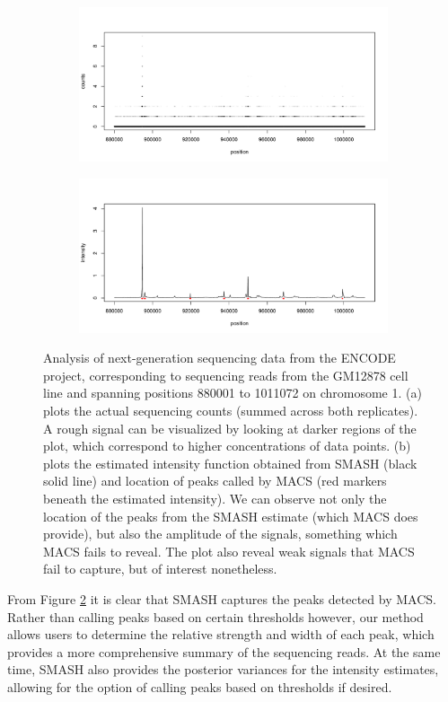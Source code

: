\documentclass[12pt]{article}
\begin{document}
\newpage
\begin{figure}
\centering
    \begin{subfigure}[b]{0.85\textwidth}
        \centering
        \includegraphics[width=\textwidth]{peaks_comp_a.png}
        \caption{}
        \label{fig:seq_peak_data}
    \end{subfigure}
    \begin{subfigure}[b]{0.85\textwidth}
        \centering
        \includegraphics[width=\textwidth]{peaks_comp_b.pdf}
        \caption{}
        \label{fig:seq_peak_est}
    \end{subfigure}
    \caption{Analysis of next-generation sequencing data from the ENCODE project, corresponding to sequencing reads from the GM12878 cell line and spanning positions 880001 to 1011072 on chromosome 1. (a) plots the actual sequencing counts (summed across both replicates). A rough signal can be visualized by looking at darker regions of the plot, which correspond to higher concentrations of data points. (b) plots the estimated intensity function obtained from SMASH (black solid line) and location of peaks called by MACS (red markers beneath the estimated intensity). We can observe not only the location of the peaks from the SMASH estimate (which MACS does provide), but also the amplitude of the signals, something which MACS fails to reveal. The plot also reveal weak signals that MACS fail to capture, but of interest nonetheless.}
    \label{fig:seq_peak}
\end{figure}
From Figure \ref{fig:seq_peak_est} it is clear that SMASH captures the peaks detected by MACS. Rather than calling peaks based on certain thresholds however, our method allows users to determine the relative strength and width of each peak, which provides a more comprehensive summary of the sequencing reads. At the same time, SMASH also provides the posterior variances for the intensity estimates, allowing for the option of calling peaks based on thresholds if desired.\\
\end{document}
